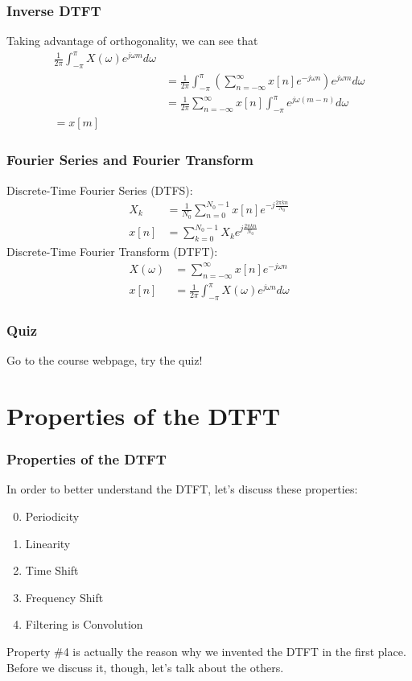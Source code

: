 \documentclass{beamer}
\begin{document}
\begin{frame}
  \frametitle{Inverse DTFT}

  Taking advantage of orthogonality, we can see that
  \begin{align*}
    \frac{1}{2\pi}\int_{-\pi}^\pi X(\omega)e^{j\omega m}d\omega\\
    &=\frac{1}{2\pi}\int_{-\pi}^{\pi}
    \left(\sum_{n=-\infty}^\infty x[n]e^{-j\omega n}\right)e^{j\omega m}d\omega\\
    &=\frac{1}{2\pi}\sum_{n=-\infty}^\infty x[n]\int_{-\pi}^\pi e^{j\omega(m-n)}d\omega\\
    = x[m]
  \end{align*}
\end{frame}

  
\begin{frame}
  \frametitle{Fourier Series and Fourier Transform}
  Discrete-Time Fourier Series (DTFS):
  \begin{align*}
    X_k &= \frac{1}{N_0}\sum_{n=0}^{N_0-1} x[n] e^{-j\frac{2\pi kn}{N_0}}\\
    x[n] &= \sum_{k=0}^{N_0-1} X_ke^{j\frac{2\pi kn}{N_0}}
  \end{align*}
  Discrete-Time Fourier Transform (DTFT):
  \begin{align*}
    X(\omega) &= \sum_{n=-\infty}^{\infty} x[n] e^{-j\omega n}\\
    x[n] &= \frac{1}{2\pi}\int_{-\pi}^\pi X(\omega)e^{j\omega n}d\omega
  \end{align*}
  
\end{frame}

\begin{frame}
  \frametitle{Quiz}

  Go to the course webpage, try the quiz!
\end{frame}

\section[DTFT Properties]{Properties of the DTFT}
\setcounter{subsection}{1}

\begin{frame}
  \frametitle{Properties of the DTFT}

  In order to better understand the DTFT, let's discuss these properties:
  \begin{enumerate}
    \setcounter{enumi}{-1}
  \item Periodicity
  \item Linearity
  \item Time Shift
  \item Frequency Shift
  \item Filtering is Convolution
  \end{enumerate}
  Property \#4 is actually the reason why we invented the DTFT in the first place.
  Before we discuss it, though, let's talk about the others.
\end{frame}
\end{document}

